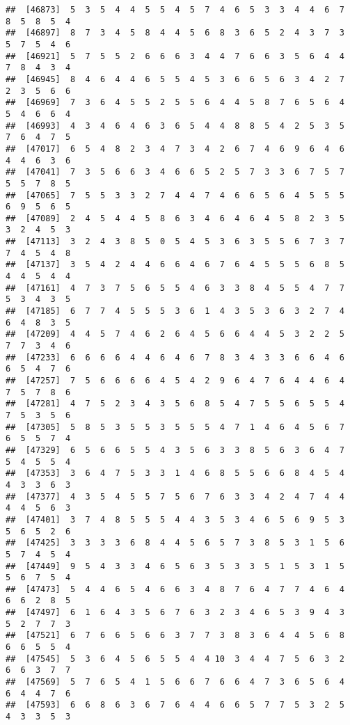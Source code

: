 \documentclass[
]{book}
\begin{document}
\begin{verbatim}
##  [46873]  5  3  5  4  4  5  5  4  5  7  4  6  5  3  3  4  4  6  7  8  5  8  5  4
##  [46897]  8  7  3  4  5  8  4  4  5  6  8  3  6  5  2  4  3  7  3  5  7  5  4  6
##  [46921]  5  7  5  5  2  6  6  6  3  4  4  7  6  6  3  5  6  4  4  7  8  4  3  4
##  [46945]  8  4  6  4  4  6  5  5  4  5  3  6  6  5  6  3  4  2  7  2  3  5  6  6
##  [46969]  7  3  6  4  5  5  2  5  5  6  4  4  5  8  7  6  5  6  4  5  4  6  6  4
##  [46993]  4  3  4  6  4  6  3  6  5  4  4  8  8  5  4  2  5  3  5  7  6  4  7  5
##  [47017]  6  5  4  8  2  3  4  7  3  4  2  6  7  4  6  9  6  4  6  4  4  6  3  6
##  [47041]  7  3  5  6  6  3  4  6  6  5  2  5  7  3  3  6  7  5  7  5  5  7  8  5
##  [47065]  7  5  5  3  3  2  7  4  4  7  4  6  6  5  6  4  5  5  5  6  9  5  6  5
##  [47089]  2  4  5  4  4  5  8  6  3  4  6  4  6  4  5  8  2  3  5  3  2  4  5  3
##  [47113]  3  2  4  3  8  5  0  5  4  5  3  6  3  5  5  6  7  3  7  7  4  5  4  8
##  [47137]  3  5  4  2  4  4  6  6  4  6  7  6  4  5  5  5  6  8  5  4  4  5  4  4
##  [47161]  4  7  3  7  5  6  5  5  4  6  3  3  8  4  5  5  4  7  7  5  3  4  3  5
##  [47185]  6  7  7  4  5  5  5  3  6  1  4  3  5  3  6  3  2  7  4  6  4  8  3  5
##  [47209]  4  4  5  7  4  6  2  6  4  5  6  6  4  4  5  3  2  2  5  7  7  3  4  6
##  [47233]  6  6  6  6  4  4  6  4  6  7  8  3  4  3  3  6  6  4  6  6  5  4  7  6
##  [47257]  7  5  6  6  6  6  4  5  4  2  9  6  4  7  6  4  4  6  4  7  5  7  8  6
##  [47281]  4  7  5  2  3  4  3  5  6  8  5  4  7  5  5  6  5  5  4  7  5  3  5  6
##  [47305]  5  8  5  3  5  5  3  5  5  5  4  7  1  4  6  4  5  6  7  6  5  5  7  4
##  [47329]  6  5  6  6  5  5  4  3  5  6  3  3  8  5  6  3  6  4  7  5  4  5  5  4
##  [47353]  3  6  4  7  5  3  3  1  4  6  8  5  5  6  6  8  4  5  4  4  3  3  6  3
##  [47377]  4  3  5  4  5  5  7  5  6  7  6  3  3  4  2  4  7  4  4  4  4  5  6  3
##  [47401]  3  7  4  8  5  5  5  4  4  3  5  3  4  6  5  6  9  5  3  5  6  5  2  6
##  [47425]  3  3  3  3  6  8  4  4  5  6  5  7  3  8  5  3  1  5  6  5  7  4  5  4
##  [47449]  9  5  4  3  3  4  6  5  6  3  5  3  3  5  1  5  3  1  5  5  6  7  5  4
##  [47473]  5  4  4  6  5  4  6  6  3  4  8  7  6  4  7  7  4  6  4  6  6  2  8  5
##  [47497]  6  1  6  4  3  5  6  7  6  3  2  3  4  6  5  3  9  4  3  5  2  7  7  3
##  [47521]  6  7  6  6  5  6  6  3  7  7  3  8  3  6  4  4  5  6  8  6  6  5  5  4
##  [47545]  5  3  6  4  5  6  5  5  4  4 10  3  4  4  7  5  6  3  2  6  6  3  7  7
##  [47569]  5  7  6  5  4  1  5  6  6  7  6  6  4  7  3  6  5  6  4  6  4  4  7  6
##  [47593]  6  6  8  6  3  6  7  6  4  4  6  6  5  7  7  5  3  2  5  4  3  3  5  3

\end{verbatim}
\end{document}
